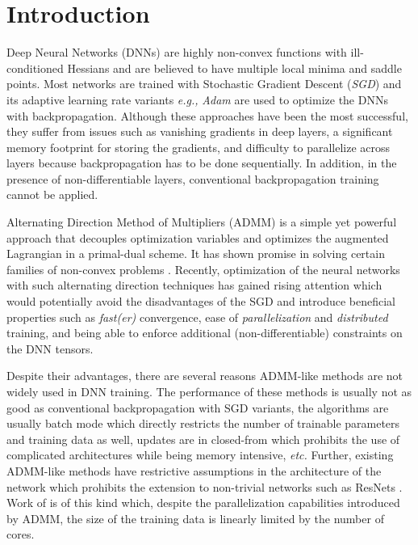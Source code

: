 \section{Introduction} \label{sec:intro}

Deep Neural Networks (DNNs) are highly non-convex functions with ill-conditioned Hessians and are believed to have multiple local minima and saddle points. Most networks are trained with %
Stochastic Gradient Descent (\textit{SGD}) and its adaptive learning rate variants \textit{e.g.,} \textit{Adam} \cite{kingma2014adam} are used to optimize the DNNs with backpropagation. Although these approaches have been the most successful, they suffer from issues such as vanishing gradients in deep layers, a significant memory footprint for storing the gradients, and difficulty to parallelize across layers because backpropagation has to be done sequentially\cite{taylor2016training}. In addition, in the presence of non-differentiable layers, conventional backpropagation training cannot be applied.%


Alternating Direction Method of Multipliers (ADMM) is a simple yet powerful approach that decouples optimization variables and optimizes the augmented Lagrangian in a primal-dual scheme. %
It has shown promise in solving certain families of non-convex problems \cite{wang2019global,huang2018mini}.
Recently, optimization of the neural networks with such alternating direction techniques has gained rising attention \cite{zeng2018global,zeng2019convergence,zhang2017convergent,gu2018fenchel,askari2018lifted} which would potentially avoid the disadvantages of the SGD and introduce beneficial properties such as \textit{fast(er)} convergence, ease of \textit{parallelization} and \textit{distributed} training, and being able to enforce additional (non-differentiable) constraints on the DNN tensors.


Despite their advantages, there are several reasons ADMM-like methods are not widely used in DNN training. The performance of these methods is usually not as good as conventional backpropagation with SGD variants, the algorithms are usually batch mode which directly restricts the number of trainable parameters and training data as well, updates are in closed-from which prohibits the use of complicated architectures while being memory intensive, \textit{etc.} Further, existing ADMM-like methods have restrictive assumptions in the architecture of the network which prohibits the extension to non-trivial networks such as ResNets \cite{he2016deep}. Work of \cite{taylor2016training} is of this kind which, despite the parallelization capabilities introduced by ADMM, the size of the training data is linearly limited by the number of cores. 


